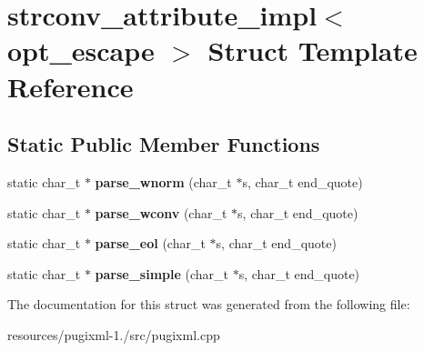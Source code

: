 \hypertarget{structstrconv__attribute__impl}{\section{strconv\+\_\+attribute\+\_\+impl$<$ opt\+\_\+escape $>$ Struct Template Reference}
\label{structstrconv__attribute__impl}
}
\subsection*{Static Public Member Functions}
\begin{DoxyCompactItemize}
\item 
\hypertarget{structstrconv__attribute__impl_a9b7f8b1e860c5d022dbd29f9a89e9e27}{static char\+\_\+t $\ast$ {\bfseries parse\+\_\+wnorm} (char\+\_\+t $\ast$s, char\+\_\+t end\+\_\+quote)}\label{structstrconv__attribute__impl_a9b7f8b1e860c5d022dbd29f9a89e9e27}

\item 
\hypertarget{structstrconv__attribute__impl_a2d39998b79896af7c53c5f3dc22a526b}{static char\+\_\+t $\ast$ {\bfseries parse\+\_\+wconv} (char\+\_\+t $\ast$s, char\+\_\+t end\+\_\+quote)}\label{structstrconv__attribute__impl_a2d39998b79896af7c53c5f3dc22a526b}

\item 
\hypertarget{structstrconv__attribute__impl_a0f57ee9d69b9d626765f4a9c8af6df2e}{static char\+\_\+t $\ast$ {\bfseries parse\+\_\+eol} (char\+\_\+t $\ast$s, char\+\_\+t end\+\_\+quote)}\label{structstrconv__attribute__impl_a0f57ee9d69b9d626765f4a9c8af6df2e}

\item 
\hypertarget{structstrconv__attribute__impl_a8358dc980178e55c8669b9dcd04872d7}{static char\+\_\+t $\ast$ {\bfseries parse\+\_\+simple} (char\+\_\+t $\ast$s, char\+\_\+t end\+\_\+quote)}\label{structstrconv__attribute__impl_a8358dc980178e55c8669b9dcd04872d7}

\end{DoxyCompactItemize}


The documentation for this struct was generated from the following file\+:\begin{DoxyCompactItemize}
\item 
resources/pugixml-\/1./src/pugixml.\+cpp\end{DoxyCompactItemize}
